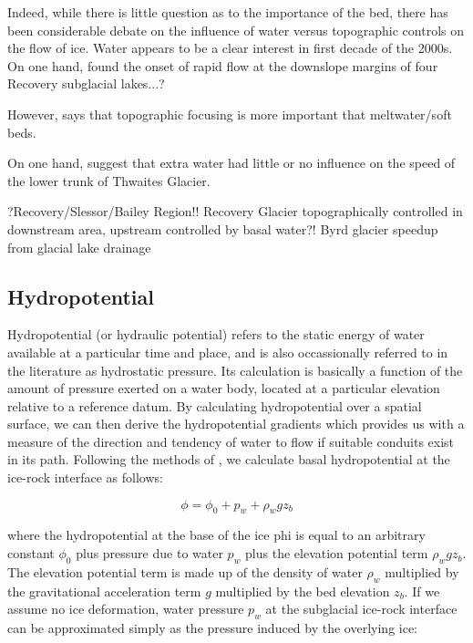 Indeed, while there is little question as to the importance of the bed, there has been considerable debate on the influence of water versus topographic controls on the flow of ice.
Water appears to be a clear interest in first decade of the 2000s.
On one hand, \citet{BellLargesubglaciallakes2007} found the onset of rapid flow at the downslope margins of four Recovery subglacial lakes...?

However, \citep{WinsborrowWhatcontrolslocation2010} says that topographic focusing is more important that meltwater/soft beds.

On one hand, \citet{SmithConnectedsubglaciallake2017} suggest that extra water had little or no influence on the speed of the lower trunk of Thwaites Glacier.

\citet{DiezBasalSettingsControl2018} ?Recovery/Slessor/Bailey Region!! Recovery Glacier topographically controlled in downstream area, upstream controlled by basal water?!
\citep{WrightSubglacialhydrologicalconnectivity2014,StearnsIncreasedflowspeed2008} Byrd glacier speedup from glacial lake drainage


\subsection{Hydropotential}

Hydropotential (or hydraulic potential) refers to the static energy of water available at a particular time and place, and is also occassionally referred to in the literature as hydrostatic pressure.
Its calculation is basically a function of the amount of pressure exerted on a water body, located at a particular elevation relative to a reference datum.
By calculating hydropotential over a spatial surface, we can then derive the hydropotential gradients which provides us with a measure of the direction and tendency of water to flow if suitable conduits exist in its path.
Following the methods of \citet{ShreveMovementWaterGlaciers1972}, we calculate basal hydropotential at the ice-rock interface as follows:

\begin{equation}\label{eq:4.1}
  \phi = \phi_0 + p_w + \rho_wgz_b
\end{equation}

where the hydropotential at the base of the ice \gls{phi} is equal to an arbitrary constant $\phi_0$ plus pressure due to water $p_w$ plus the elevation potential term $\rho_wgz_b$.
The elevation potential term is made up of the density of water $\rho_w$ multiplied by the gravitational acceleration term $g$ multiplied by the bed elevation $z_b$.
If we assume no ice deformation, water pressure $p_w$ at the subglacial ice-rock interface can be approximated simply as the pressure induced by the overlying ice:

